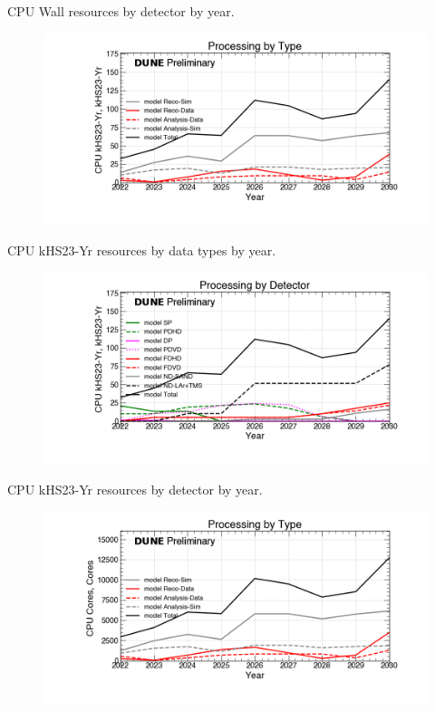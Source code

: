 \begin{table}[h]
\label{tab:CPU Wall_Detectors}
\caption{CPU Wall resources by detector by year.}
\end{table}
\pagebreak
\begin{figure}[ht]
\centering\includegraphics[height=0.4\textwidth]{Feb24_noMWC_Processing-by-Type-CPU-kHS23-Yr.png}\end{figure}
\begin{table}[h]
\label{tab:CPU kHS23-Yr_Types}
\caption{CPU kHS23-Yr resources by data types by year.}
\end{table}
\pagebreak
\begin{figure}[ht]
\centering\includegraphics[height=0.4\textwidth]{Feb24_noMWC_Processing-by-Detector-CPU-kHS23-Yr.png}\end{figure}
\begin{table}[h]
\label{tab:CPU kHS23-Yr_Detectors}
\caption{CPU kHS23-Yr resources by detector by year.}
\end{table}
\pagebreak
\begin{figure}[ht]
\centering\includegraphics[height=0.4\textwidth]{Feb24_noMWC_Processing-by-Type-CPU-Cores.png}\end{figure}

